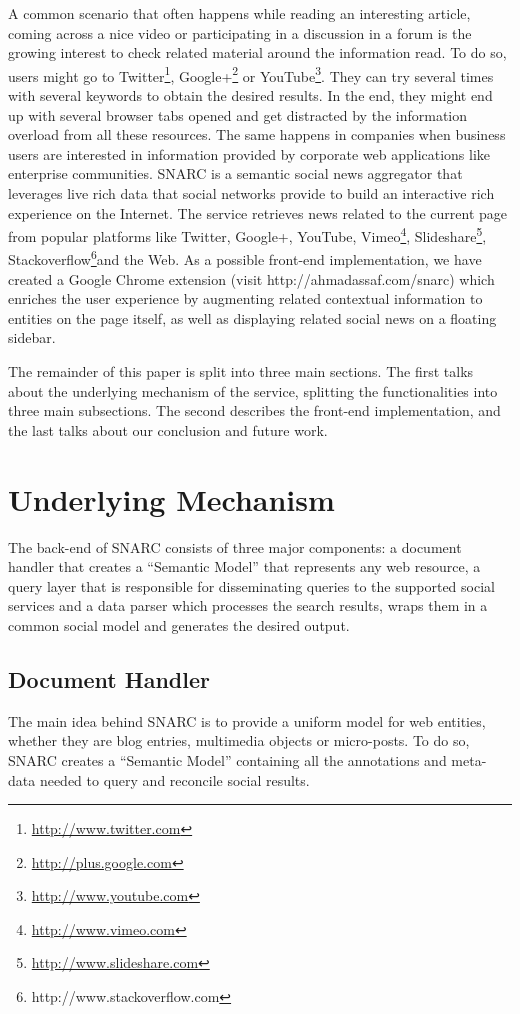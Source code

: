 \documentclass[oribibl]{../../Tools/LaTEX/llncs}
\begin{document}
A common scenario that often happens while reading an interesting article, coming across a nice video or participating in a discussion in a forum is the growing interest to check related material around the information read. To do so, users might go to Twitter\footnote{\url{http://www.twitter.com}}, Google+\footnote{\url{http://plus.google.com}} or YouTube\footnote{\url{http://www.youtube.com}}. They can try several times with several keywords to obtain the desired results. In the end, they might end up with several browser tabs opened and get distracted by the information overload from all these resources. The same happens in companies when business users are interested in information provided by corporate web applications like enterprise communities. SNARC is a semantic social news aggregator that leverages live rich data that social networks provide to build an interactive rich experience on the Internet. The service retrieves news related to the current page from popular platforms like Twitter, Google+, YouTube, Vimeo\footnote{\url{http://www.vimeo.com}}, Slideshare\footnote{\url{http://www.slideshare.com}}, Stackoverflow\footnote{http://www.stackoverflow.com}and the Web. As a possible front-end implementation, we have created a Google Chrome extension (visit http://ahmadassaf.com/snarc) which enriches the user experience by augmenting related contextual information to entities on the page itself, as well as displaying related social news on a floating sidebar.

The remainder of this paper is split into three main sections. The first talks about the underlying mechanism of the service, splitting the functionalities into three main subsections. The second describes the front-end implementation, and the last talks about our conclusion and future work.


\section{Underlying Mechanism}
The back-end of SNARC consists of three major components: a document handler that creates a ``Semantic Model'' that represents any web resource, a query layer that is responsible for disseminating queries to the supported social services and a data parser which processes the search results, wraps them in a common social model and generates the desired output.

\subsection{Document Handler}
The main idea behind SNARC is to provide a uniform model for web entities, whether they are blog entries, multimedia objects or micro-posts. To do so, SNARC creates a ``Semantic Model'' containing all the annotations and meta-data needed to query and reconcile social results.
\end{document}

